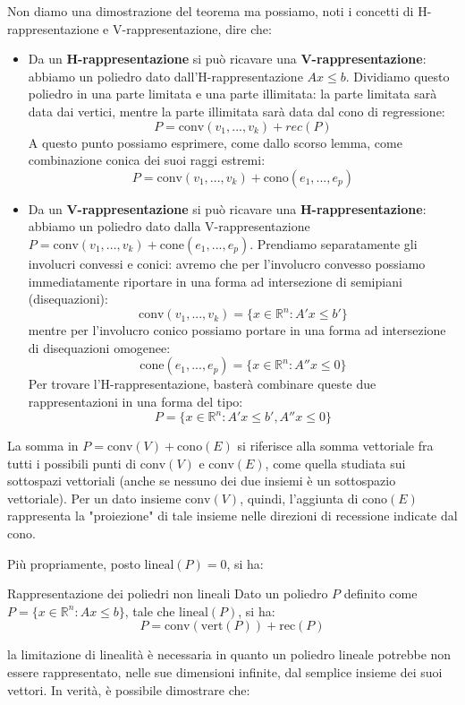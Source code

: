 \documentclass[a4paper,11pt]{article}
\begin{document}
\par\smallskip

Non diamo una dimostrazione del teorema ma possiamo, noti i concetti di H-rappresentazione e V-rappresentazione, dire che:
\begin{itemize}
	\item Da un \textbf{H-rappresentazione} si può ricavare una \textbf{V-rappresentazione}:
		abbiamo un poliedro dato dall'H-rappresentazione $Ax \leq b$.
		Dividiamo questo poliedro in una parte limitata e una parte illimitata: la parte limitata sarà data dai vertici, mentre la parte illimitata sarà data dal cono di regressione:
		$$ P = \mathrm{conv}(v_1,...,v_k) + rec(P)$$
		A questo punto possiamo esprimere, come dallo scorso lemma, come combinazione conica dei suoi raggi estremi:
		$$ P = \mathrm{conv}(v_1, ..., v_k) + \mathrm{cono}(e_1, ..., e_p) $$

	\item Da un \textbf{V-rappresentazione} si può ricavare una \textbf{H-rappresentazione}:
		abbiamo un poliedro dato dalla V-rappresentazione $P = \mathrm{conv}(v_1, ..., v_k) + \mathrm{cone}(e_1, ..., e_p)$.
		Prendiamo separatamente gli involucri convessi e conici: avremo che per l'involucro convesso possiamo immediatamente riportare in una forma ad intersezione di semipiani (disequazioni):
		$$ \mathrm{conv}(v_1, ..., v_k) = \{ x \in \mathbb{R}^n : A'x \leq b' \} $$
		mentre per l'involucro conico possiamo portare in una forma ad intersezione di disequazioni omogenee:
		$$ \mathrm{cone}(e_1, ..., e_p) = \{ x \in \mathbb{R}^n : A''x \leq 0 \} $$
		Per trovare l'H-rappresentazione, basterà combinare queste due rappresentazioni in una forma del tipo:
		$$ P = \{ x \in \mathbb{R}^n : A'x \leq b', A''x \leq 0 \}$$
\end{itemize}

La somma in $P = \mathrm{conv}(V) + \mathrm{cono}(E)$ si riferisce alla somma vettoriale fra tutti i possibili punti di $\mathrm{conv}(V)$ e $\mathrm{conv}(E)$, come quella studiata sui sottospazi vettoriali (anche se nessuno dei due insiemi è un sottospazio vettoriale).
Per un dato insieme $\mathrm{conv}(V)$, quindi, l'aggiunta di $\mathrm{cono}(E)$ rappresenta la "proiezione" di tale insieme nelle direzioni di recessione indicate dal cono.

Più propriamente, posto $\mathrm{lineal}(P) = {0}$, si ha:

\begin{theorem}{Rappresentazione dei poliedri non lineali}
	Dato un poliedro $P$ definito come $P = \{ x \in \mathbb{R}^n : Ax \leq b \}$, tale che $\mathrm{lineal}(P)$, si ha:
	$$
	P = \mathrm{conv}(\mathrm{vert}(P)) + \mathrm{rec}(P)
	$$
\end{theorem}
la limitazione di linealità è necessaria in quanto un poliedro lineale potrebbe non essere rappresentato, nelle sue dimensioni infinite, dal semplice insieme dei suoi vettori.
In verità, è possibile dimostrare che:
\end{document}
